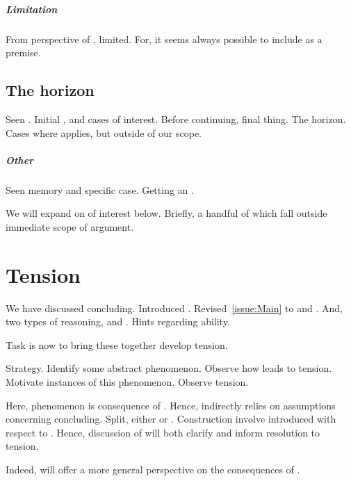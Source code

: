 \subparagraph{Limitation}

\begin{note}
  From perspective of \EAS{}, limited.
  For, it seems always possible to include \itp{} as a premise.
\end{note}


\subsection{The horizon}

\begin{note}
  Seen \adB{}.
  Initial , and cases of interest.
  Before continuing,  final thing.
  The horizon.
  Cases where \adB{} applies, but outside of our scope.
\end{note}

\subparagraph{Other }

\begin{note}
  Seen memory and specific case.
  Getting an \itp{}.

  We will expand on  of interest below.
  Briefly, a handful of  which fall outside immediate scope of argument.
\end{note}

\section{Tension}
\label{sec:tension}

\begin{note}[Intro]
  We have discussed concluding.
  Introduced \csN{}.
  Revised~\autoref{issue:Main} to \ESU{} and \EAS{}.
  And, two types of reasoning, \adA{} and \adB{}.
  Hints regarding ability.

  Task is now to bring these together develop tension.
\end{note}

\begin{note}
  Strategy.
  Identify some abstract phenomenon.
  Observe how leads to tension.
  Motivate instances of this phenomenon.
  Observe tension.

  Here, phenomenon is consequence of \csN{}.
  Hence, indirectly relies on assumptions concerning concluding.
  Split, either \ESU{} or \EAS{}.
  Construction involve \itp{} introduced with respect to \adB{}.
  Hence, discussion of \adB{} will both clarify and inform resolution to tension.

  Indeed, \adB{} will offer a more general perspective on the consequences of \csN{}.
\end{note}

